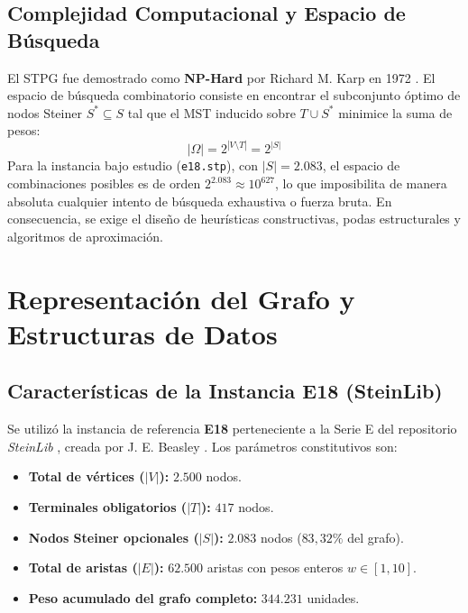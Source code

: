 \documentclass[11pt,a4paper]{article}
\begin{document}
\subsection{Complejidad Computacional y Espacio de Búsqueda}
El STPG fue demostrado como \textbf{NP-Hard} por Richard M. Karp en 1972 \cite{karp1972reducibility}. El espacio de búsqueda combinatorio consiste en encontrar el subconjunto óptimo de nodos Steiner $S^* \subseteq S$ tal que el MST inducido sobre $T \cup S^*$ minimice la suma de pesos:
\begin{equation}
    |\Omega| = 2^{|V \setminus T|} = 2^{|S|}
\end{equation}
Para la instancia bajo estudio (\texttt{e18.stp}), con $|S| = 2.083$, el espacio de combinaciones posibles es de orden $2^{2.083} \approx 10^{627}$, lo que imposibilita de manera absoluta cualquier intento de búsqueda exhaustiva o fuerza bruta. En consecuencia, se exige el diseño de heurísticas constructivas, podas estructurales y algoritmos de aproximación.

\section{Representación del Grafo y Estructuras de Datos}
\label{sec:grafo}

\subsection{Características de la Instancia E18 (SteinLib)}
Se utilizó la instancia de referencia \textbf{E18} perteneciente a la Serie E del repositorio \textit{SteinLib} \cite{steinlib}, creada por J. E. Beasley \cite{beasley1990orlibrary}. Los parámetros constitutivos son:
\begin{itemize}
    \item \textbf{Total de vértices ($|V|$):} $2.500$ nodos.
    \item \textbf{Terminales obligatorios ($|T|$):} $417$ nodos.
    \item \textbf{Nodos Steiner opcionales ($|S|$):} $2.083$ nodos ($83,32\%$ del grafo).
    \item \textbf{Total de aristas ($|E|$):} $62.500$ aristas con pesos enteros $w \in [1, 10]$.
    \item \textbf{Peso acumulado del grafo completo:} $344.231$ unidades.
\end{itemize}
\end{document}
